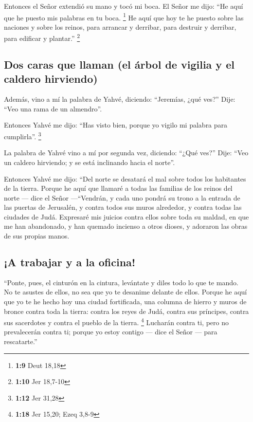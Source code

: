  Entonces el Señor extendió su mano y tocó mi boca. El
Señor me dijo: ``He aquí que he puesto mis palabras en tu boca.
\footnote{\textbf{1:9} Deut 18,18}  He aquí que hoy te he
puesto sobre las naciones y sobre los reinos, para arrancar y derribar,
para destruir y derribar, para edificar y plantar.'' \footnote{\textbf{1:10}
  Jer 18,7-10}

\hypertarget{dos-caras-que-llaman-el-uxe1rbol-de-vigilia-y-el-caldero-hirviendo}{%
\subsection{Dos caras que llaman (el árbol de vigilia y el caldero
hirviendo)}\label{dos-caras-que-llaman-el-uxe1rbol-de-vigilia-y-el-caldero-hirviendo}}

 Además, vino a mí la palabra de Yahvé, diciendo:
``Jeremías, ¿qué ves?'' Dije: ``Veo una rama de un almendro''.

 Entonces Yahvé me dijo: ``Has visto bien, porque yo
vigilo mi palabra para cumplirla''. \footnote{\textbf{1:12} Jer 31,28}

 La palabra de Yahvé vino a mí por segunda vez, diciendo:
``¿Qué ves?'' Dije: ``Veo un caldero hirviendo; y se está inclinando
hacia el norte''.

 Entonces Yahvé me dijo: ``Del norte se desatará el mal
sobre todos los habitantes de la tierra.  Porque he aquí
que llamaré a todas las familias de los reinos del norte --- dice el
Señor ---``Vendrán, y cada uno pondrá su trono a la entrada de las
puertas de Jerusalén, y contra todos sus muros alrededor, y contra todas
las ciudades de Judá.  Expresaré mis juicios contra ellos
sobre toda su maldad, en que me han abandonado, y han quemado incienso a
otros dioses, y adoraron las obras de sus propias manos.

\hypertarget{a-trabajar-y-a-la-oficina}{%
\subsection{¡A trabajar y a la
oficina!}\label{a-trabajar-y-a-la-oficina}}

 ``Ponte, pues, el cinturón en la cintura, levántate y
diles todo lo que te mando. No te asustes de ellos, no sea que yo te
desanime delante de ellos.  Porque he aquí que yo te he
hecho hoy una ciudad fortificada, una columna de hierro y muros de
bronce contra toda la tierra: contra los reyes de Judá, contra sus
príncipes, contra sus sacerdotes y contra el pueblo de la tierra.
\footnote{\textbf{1:18} Jer 15,20; Ezeq 3,8-9}  Lucharán
contra ti, pero no prevalecerán contra ti; porque yo estoy contigo ---
dice el Señor --- para rescatarte.''


